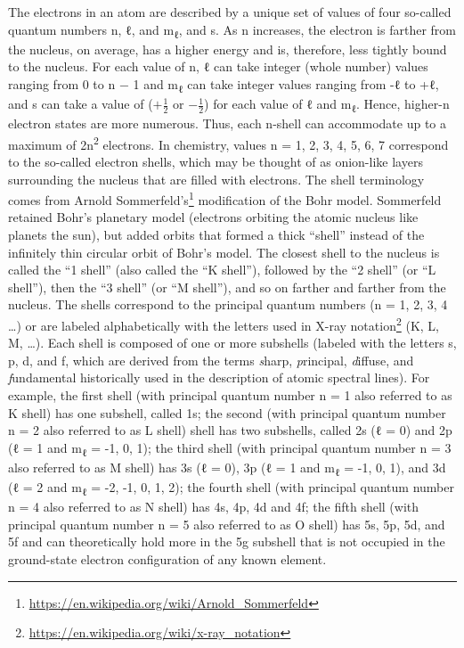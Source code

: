 \documentclass[
]{book}
\renewcommand{\href}[2]{#2\footnote{\url{#1}}}
\begin{document}
The electrons in an atom are described by a unique set of values of four so-called quantum numbers n, ℓ, and m\textsubscript{ℓ}, and s. As n increases, the electron is farther from the nucleus, on average, has a higher energy and is, therefore, less tightly bound to the nucleus. For each value of n, ℓ can take integer (whole number) values ranging from 0 to n − 1 and m\textsubscript{ℓ} can take integer values ranging from -ℓ to +ℓ, and s can take a value of (\(+\frac{1}{2}\) or \(-\frac{1}{2}\)) for each value of ℓ and m\textsubscript{ℓ}. Hence, higher-n electron states are more numerous. Thus, each n-shell can accommodate up to a maximum of 2n\textsuperscript{2} electrons. In chemistry, values n = 1, 2, 3, 4, 5, 6, 7 correspond to the so-called electron shells, which may be thought of as onion-like layers surrounding the nucleus that are filled with electrons. The shell terminology comes from \href{https://en.wikipedia.org/wiki/Arnold_Sommerfeld}{Arnold Sommerfeld's} modification of the Bohr model. Sommerfeld retained Bohr's planetary model (electrons orbiting the atomic nucleus like planets the sun), but added orbits that formed a thick ``shell'' instead of the infinitely thin circular orbit of Bohr's model. The closest shell to the nucleus is called the ``1 shell'' (also called the ``K shell''), followed by the ``2 shell'' (or ``L shell''), then the ``3 shell'' (or ``M shell''), and so on farther and farther from the nucleus. The shells correspond to the principal quantum numbers (n = 1, 2, 3, 4 \ldots) or are labeled alphabetically with the letters used in \href{https://en.wikipedia.org/wiki/x-ray_notation}{X-ray notation} (K, L, M, \ldots). Each shell is composed of one or more subshells (labeled with the letters s, p, d, and f, which are derived from the terms \emph{s}harp, \emph{p}rincipal, \emph{d}iffuse, and \emph{f}undamental historically used in the description of atomic spectral lines). For example, the first shell (with principal quantum number n = 1 also referred to as K shell) has one subshell, called 1s; the second (with principal quantum number n = 2 also referred to as L shell) shell has two subshells, called 2s (ℓ = 0) and 2p (ℓ = 1 and m\textsubscript{ℓ} = -1, 0, 1); the third shell (with principal quantum number n = 3 also referred to as M shell) has 3s (ℓ = 0), 3p (ℓ = 1 and m\textsubscript{ℓ} = -1, 0, 1), and 3d (ℓ = 2 and m\textsubscript{ℓ} = -2, -1, 0, 1, 2); the fourth shell (with principal quantum number n = 4 also referred to as N shell) has 4s, 4p, 4d and 4f; the fifth shell (with principal quantum number n = 5 also referred to as O shell) has 5s, 5p, 5d, and 5f and can theoretically hold more in the 5g subshell that is not occupied in the ground-state electron configuration of any known element.
\end{document}
